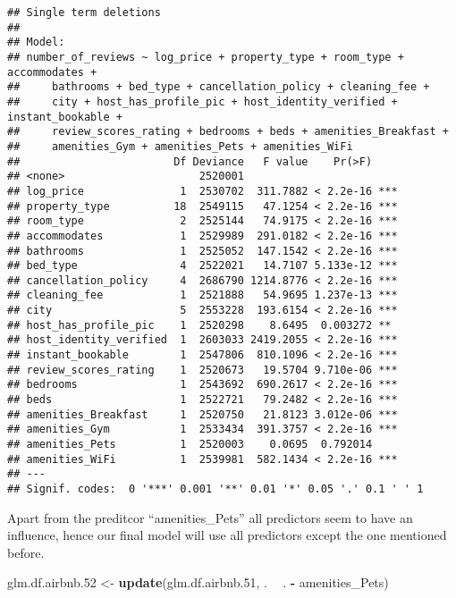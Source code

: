 \documentclass[
]{article}
\newenvironment{Shaded}{\begin{snugshade}}{\end{snugshade}}
\newcommand{\FloatTok}[1]{\textcolor[rgb]{0.00,0.00,0.81}{#1}}
\newcommand{\KeywordTok}[1]{\textcolor[rgb]{0.13,0.29,0.53}{\textbf{#1}}}
\newcommand{\NormalTok}[1]{#1}
\newcommand{\OperatorTok}[1]{\textcolor[rgb]{0.81,0.36,0.00}{\textbf{#1}}}
\newcommand{\StringTok}[1]{\textcolor[rgb]{0.31,0.60,0.02}{#1}}
\begin{document}
\begin{verbatim}
## Single term deletions
## 
## Model:
## number_of_reviews ~ log_price + property_type + room_type + accommodates + 
##     bathrooms + bed_type + cancellation_policy + cleaning_fee + 
##     city + host_has_profile_pic + host_identity_verified + instant_bookable + 
##     review_scores_rating + bedrooms + beds + amenities_Breakfast + 
##     amenities_Gym + amenities_Pets + amenities_WiFi
##                        Df Deviance   F value    Pr(>F)    
## <none>                     2520001                        
## log_price               1  2530702  311.7882 < 2.2e-16 ***
## property_type          18  2549115   47.1254 < 2.2e-16 ***
## room_type               2  2525144   74.9175 < 2.2e-16 ***
## accommodates            1  2529989  291.0182 < 2.2e-16 ***
## bathrooms               1  2525052  147.1542 < 2.2e-16 ***
## bed_type                4  2522021   14.7107 5.133e-12 ***
## cancellation_policy     4  2686790 1214.8776 < 2.2e-16 ***
## cleaning_fee            1  2521888   54.9695 1.237e-13 ***
## city                    5  2553228  193.6154 < 2.2e-16 ***
## host_has_profile_pic    1  2520298    8.6495  0.003272 ** 
## host_identity_verified  1  2603033 2419.2055 < 2.2e-16 ***
## instant_bookable        1  2547806  810.1096 < 2.2e-16 ***
## review_scores_rating    1  2520673   19.5704 9.710e-06 ***
## bedrooms                1  2543692  690.2617 < 2.2e-16 ***
## beds                    1  2522721   79.2482 < 2.2e-16 ***
## amenities_Breakfast     1  2520750   21.8123 3.012e-06 ***
## amenities_Gym           1  2533434  391.3757 < 2.2e-16 ***
## amenities_Pets          1  2520003    0.0695  0.792014    
## amenities_WiFi          1  2539981  582.1434 < 2.2e-16 ***
## ---
## Signif. codes:  0 '***' 0.001 '**' 0.01 '*' 0.05 '.' 0.1 ' ' 1
\end{verbatim}

Apart from the preditcor ``amenities\_Pets'' all predictors seem to have
an influence, hence our final model will use all predictors except the
one mentioned before.

\begin{Shaded}
\begin{Highlighting}[]
\NormalTok{glm.df.airbnb}\FloatTok{.52}\NormalTok{ <-}\StringTok{ }\KeywordTok{update}\NormalTok{(glm.df.airbnb}\FloatTok{.51}\NormalTok{, . }\OperatorTok{~}\StringTok{ }\NormalTok{. }\OperatorTok{-}\StringTok{ }\NormalTok{amenities_Pets)}
\end{Highlighting}
\end{Shaded}
\end{document}
